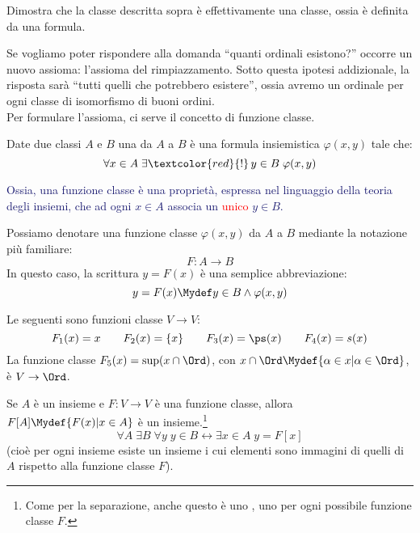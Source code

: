 \documentclass[11pt]{scrartcl}
\begin{document}
\begin{exercise}
	Dimostra che la classe descritta sopra è effettivamente una classe, ossia è definita da una formula.
\end{exercise}

Se vogliamo poter rispondere alla domanda ``quanti ordinali esistono?'' occorre un nuovo assioma: l'assioma del rimpiazzamento. Sotto questa ipotesi addizionale, la risposta sarà
``tutti quelli che potrebbero esistere'', ossia avremo un ordinale per ogni classe di isomorfismo di buoni ordini.\\
Per formulare l'assioma, ci serve il concetto di funzione classe.

\begin{definition}
	Date due classi $A$ e $B$ una  da $A$ a $B$ è una formula insiemistica $\varphi(x,y)$ tale che:
	\[ \forall x \in A \;\exists \textcolor{red}{!}\,y \in B \; \varphi(x,y)
		\]
\end{definition}

\textcolor{MidnightBlue}{Ossia, una funzione classe è una proprietà, espressa nel linguaggio della teoria degli insiemi, che ad ogni $x \in A$ associa un \textcolor{red}{unico} $y \in B$.}

\begin{notation}
	Possiamo denotare una funzione classe $\varphi(x,y)$ da $A$ a $B$ mediante la notazione più familiare:
	\[ F : A \rightarrow B
		\]
	In questo caso, la scrittura $y = F(x)$ è una semplice abbreviazione:
	\[ y = F(x) \Mydef y \in B \land \varphi(x,y)
		\]
\end{notation}

\begin{example}
	Le seguenti sono funzioni classe $V \rightarrow V$:
	\[ F_1(x) = x \qquad F_2(x) = \{x\} \qquad F_3(x) = \ps(x) \qquad F_4(x) = s(x)
		\]
	La funzione classe $F_5(x) = \sup(x \cap \Ord)$, con $x \cap \Ord \Mydef \{\alpha \in x | \alpha \in \Ord\}$, è $V \rightarrow \Ord$.
\end{example}

\begin{axiom}
	\label{ax8}
	Se $A$ è un insieme e $F : V \rightarrow V$ è una funzione classe, allora $F[A] \Mydef \{F(x) | x \in A\}$ è un insieme.\footnote{Come per la separazione, anche questo è uno , uno per ogni possibile funzione classe $F$.}
	\[ \forall A \; \exists B \; \forall y \; y \in B \leftrightarrow \exists x \in A \; y = F[x]
		\]
	(cioè per ogni insieme esiste un insieme i cui elementi sono immagini di quelli di $A$ rispetto alla funzione classe $F$).
\end{axiom}
\end{document}
